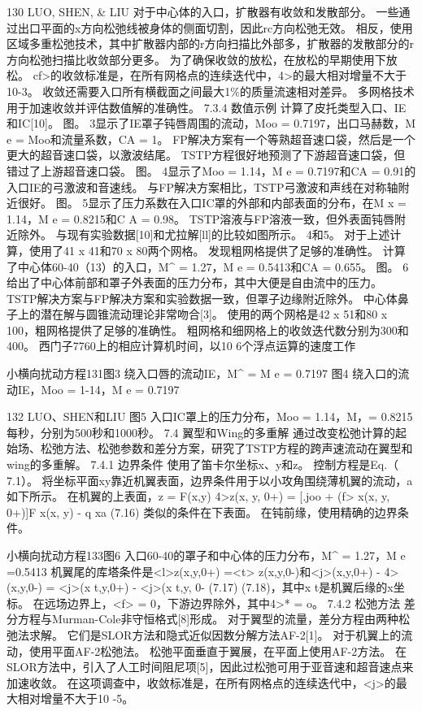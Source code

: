 \documentclass[UTF8,11pt,a4paper,openany,fontset=fandol]{ctexbook}
\begin{document}
130 LUO, SHEN, \& LIU 对于中心体的入口，扩散器有收敛和发散部分。 一些通过出口平面的x方向松弛线被身体的侧面切割，因此rc方向松弛无效。 相反，使用区域多重松弛技术，其中扩散器内部的r方向扫描比外部多，扩散器的发散部分的r方向松弛扫描比收敛部分更多。 为了确保收敛的放松，在放松的早期使用下放松。 cf>的收敛标准是，在所有网格点的连续迭代中，4>的最大相对增量不大于10-3。 收敛还需要入口所有横截面之间最大1\%的质量流速相对差异。 多网格技术用于加速收敛并评估数值解的准确性。 7.3.4 数值示例 计算了皮托类型入口、IE和IC[10]。 图。 3显示了IE罩子钝唇周围的流动，Moo = 0.7197，出口马赫数，M e = Moo和流量系数，CA = 1。 FP解决方案有一个等熟超音速口袋，然后是一个更大的超音速口袋，以激波结尾。 TSTP方程很好地预测了下游超音速口袋，但错过了上游超音速口袋。 图。 4显示了Moo = 1.14，M e = 0.7197和CA = 0.91的入口IE的弓激波和音速线。 与FP解决方案相比，TSTP弓激波和声线在对称轴附近很好。 图。 5显示了压力系数在入口IC罩的外部和内部表面的分布，在M x = 1.14，M e = 0.8215和C A = 0.98。 TSTP溶液与FP溶液一致，但外表面钝唇附近除外。 与现有实验数据[10]和尤拉解[ll]的比较如图所示。 4和5。 对于上述计算，使用了41 x 41和70 x 80两个网格。 发现粗网格提供了足够的准确性。 计算了中心体60-40（13）的入口，M\textasciicircum{} = 1.27，M e = 0.5413和CA = 0.655。 图。 6给出了中心体前部和罩子外表面的压力分布，其中大便是自由流中的压力。 TSTP解决方案与FP解决方案和实验数据一致，但罩子边缘附近除外。 中心体鼻子上的潜在解与圆锥流动理论非常吻合[3]。 使用的两个网格是42 x 51和80 x 100，粗网格提供了足够的准确性。 粗网格和细网格上的收敛迭代数分别为300和400。 西门子7760上的相应计算机时间，以10 6个浮点运算的速度工作

小横向扰动方程131图3 绕入口唇的流动IE，M\textasciicircum{} = M e = 0.7197 图4 绕入口的流动IE，Moo = 1-14，M e = 0.7197

132 LUO、SHEN和LIU 图5 入口IC罩上的压力分布，Moo = 1.14，M，= 0.8215每秒，分别为500秒和1000秒。 7.4 翼型和Wing的多重解 通过改变松弛计算的起始场、松弛方法、松弛参数和差分方案，研究了TSTP方程的跨声速流动在翼型和wing的多重解。 7.4.1 边界条件 使用了笛卡尔坐标x、y和z。 控制方程是Eq.（ 7.1）。 将坐标平面xy靠近机翼表面，边界条件用于以小攻角围绕薄机翼的流动，a如下所示。 在机翼的上表面，z = F(x,y) 4>z(x, y, 0+) = [.joo + (f> x(x, y, 0+)]F x(x, y) - q xa (7.16) 类似的条件在下表面。 在钝前缘，使用精确的边界条件。

小横向扰动方程133图6 入口60-40的罩子和中心体的压力分布，M\textasciicircum{} = 1.27，M e =0.5413 机翼尾的库塔条件是<l>z(x,y,0+) =<t> z(x,y,0-)和<j>(x,y,0+) - 4>(x,y,0-) = <j>(x t,y,0+) - <j>(x t,y, 0- (7.17) (7.18)，其中x t是机翼后缘的x坐标。 在远场边界上，<f> = 0，下游边界除外，其中4>* = o。 7.4.2 松弛方法 差分方程与Murman-Cole非守恒格式[8]形成。 对于翼型的流量，差分方程由两种松弛法求解。 它们是SLOR方法和隐式近似因数分解方法AF-2[1]。 对于机翼上的流动，使用平面AF-2松弛法。 松弛平面垂直于翼展，在平面上使用AF-2方法。 在SLOR方法中，引入了人工时间阻尼项[5]，因此过松弛可用于亚音速和超音速点来加速收敛。 在这项调查中，收敛标准是，在所有网格点的连续迭代中，<j>的最大相对增量不大于10 -5。
\end{document}
